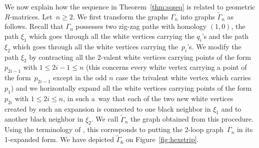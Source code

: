 \documentclass[pdftex]{sigma}
\numberwithin{equation}{section}
\begin{document}
	
	We now explain how the sequence in Theorem~\ref{thm:sqseq} is related to geometric $R$-matrices. Let~${n\geq2}$. We first transform the graphs $\Gamma_n$ into graphs $\widetilde{\Gamma}_n$ as follows. Recall that $\Gamma_n$ possesses two zig-zag paths with homology $(1,0)$, the path $\xi_1$ which goes through all the white vertices carrying the $q_i$'s and the path $\xi_2$ which goes through all the white vertices carrying the~$p_i$'s. We modify the path $\xi_2$ by contracting all the 2-valent white vertices carrying points of the form $p_{2i-1}$ with $1\leq 2i-1\leq n$ (this concerns every white vertex carrying a point of the form~$p_{2i-1}$ except in the odd $n$ case the trivalent white vertex which carries $p_1$) and we horizontally expand all the white vertices carrying points of the form $p_{2i}$ with $1\leq 2i\leq n$, in such a~way that each of the two new white vertices created by such an expansion is connected to one black neighbor in $\xi_1$ and to another black neighbor in $\xi_2$. We call $\widetilde{\Gamma}_n$ the graph obtained from this procedure. Using the terminology of \cite{Chepuri}, this corresponds to putting the 2-loop graph~$\Gamma_n$ in its 1-expanded form. We have depicted $\widetilde{\Gamma}_6$ on Figure~\ref{fig:hexstrip}.
	
\end{document}
